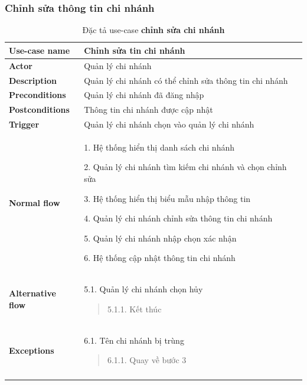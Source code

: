 \subsubsection{Chỉnh sửa thông tin chi nhánh}
{
    \setlength\extrarowheight{6pt}
    \begin{longtable}{| p{} | p{} |}
        \hline
        \textbf{Use-case name}
         &
        Chỉnh sửa tin chi nhánh
        \\
        \hline
        \textbf{Actor}
         &
        Quản lý chi nhánh
        \\
        \hline
        \textbf{Description}
         &
        Quản lý chi nhánh có thể chỉnh sửa thông tin chi nhánh
        \\
        \hline
        \textbf{Preconditions}
         &
        Quản lý chi nhánh đã đăng nhập
        \\
        \hline
        \textbf{Postconditions}
         &
        Thông tin chi nhánh được cập nhật
        \\
        \hline
        \textbf{Trigger}
         &
        Quản lý chi nhánh chọn vào quản lý chi nhánh
        \\
        \hline
        \begin{flushleft}
            \textbf{Normal flow}
        \end{flushleft}
         &
        1. Hệ thống hiển thị danh sách chi nhánh

        2. Quản lý chi nhánh tìm kiếm chi nhánh và chọn chỉnh sửa

        3. Hệ thống hiển thị biểu mẫu nhập thông tin

        4. Quản lý chi nhánh chỉnh sửa thông tin chi nhánh

        5. Quản lý chi nhánh nhập chọn xác nhận

        6. Hệ thống cập nhật thông tin  chi nhánh
        \\
        \hline
        \begin{flushleft}
            \textbf{Alternative flow}
        \end{flushleft}
         &
        5.1. Quản lý chi nhánh chọn hủy
        \begin{quote}
            5.1.1. Kết thúc
        \end{quote}
        \\
        \hline
        \begin{flushleft}
            \textbf{Exceptions}
        \end{flushleft}
         &
        6.1. Tên chi nhánh bị trùng
        \begin{quote}
            6.1.1. Quay về bước 3
        \end{quote}
        \\
        \hline
        \caption{Đặc tả use-case \textbf{chỉnh sửa chi nhánh}}
    \end{longtable}
}

